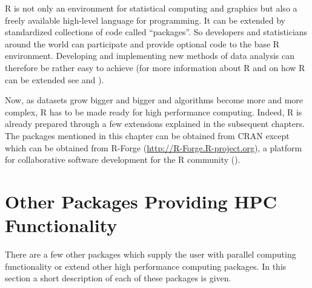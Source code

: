 R is not only an environment for statistical computing and graphics
but also a freely available high-level language for programming. It
can be extended by standardized collections of code called
``packages''. So developers and statisticians around the world can
participate and provide optional code to the base R environment.
Developing and implementing new methods of data analysis can therefore
be rather easy to achieve (for more information about R and on how R can
be extended see \cite{hornik07Rfaq} and \cite{Rcore07Ext}). 


Now, as datasets grow bigger and bigger and algorithms become more and
more complex, R has to be made ready for high performance
computing. Indeed, R is already prepared through a few extensions
explained in the 
subsequent chapters. The packages mentioned in this chapter can be
obtained from CRAN except  which can be obtained from
R-Forge (\url{http://R-Forge.R-project.org}), a platform for
collaborative software development for the R community
(\cite{theussl07R-Forge}).









\section{Other Packages Providing HPC Functionality}
\label{sec:otherpackages}
There are a few other packages which supply the user with parallel
computing functionality or extend other high performance computing
packages. In this section a short description of each of these
packages is given.

